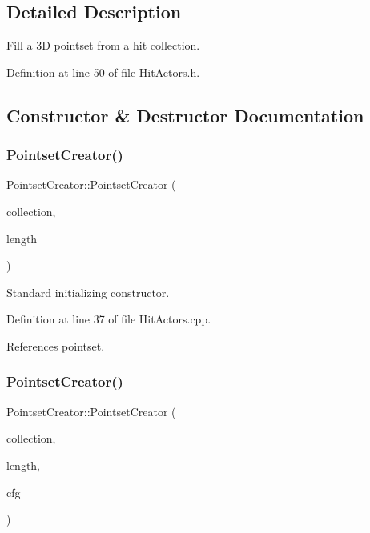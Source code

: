 \subsection{Detailed Description}
Fill a 3D pointset from a hit collection. 

Definition at line 50 of file Hit\+Actors.\+h.



\subsection{Constructor \& Destructor Documentation}
\hypertarget{struct_d_d4hep_1_1_pointset_creator_abe227e7b97ff9fdca5a8251994a301df}{}\label{struct_d_d4hep_1_1_pointset_creator_abe227e7b97ff9fdca5a8251994a301df} 
\subsubsection{\texorpdfstring{Pointset\+Creator()}{PointsetCreator()}\hspace{0.1cm}{\footnotesize\ttfamily [1/2]}}
{\footnotesize\ttfamily Pointset\+Creator\+::\+Pointset\+Creator (\begin{DoxyParamCaption}\item[{const std\+::string \&}]{collection,  }\item[{size\+\_\+t}]{length }\end{DoxyParamCaption})}



Standard initializing constructor. 



Definition at line 37 of file Hit\+Actors.\+cpp.



References pointset.

\hypertarget{struct_d_d4hep_1_1_pointset_creator_af9e8ec4b156dce9ac15a0a0ee1214176}{}\label{struct_d_d4hep_1_1_pointset_creator_af9e8ec4b156dce9ac15a0a0ee1214176} 
\subsubsection{\texorpdfstring{Pointset\+Creator()}{PointsetCreator()}\hspace{0.1cm}{\footnotesize\ttfamily [2/2]}}
{\footnotesize\ttfamily Pointset\+Creator\+::\+Pointset\+Creator (\begin{DoxyParamCaption}\item[{const std\+::string \&}]{collection,  }\item[{size\+\_\+t}]{length,  }\item[{const \hyperlink{class_d_d4hep_1_1_display_configuration_1_1_config}{Display\+Configuration\+::\+Config} \&}]{cfg }\end{DoxyParamCaption})}



